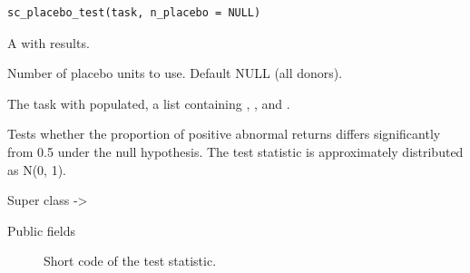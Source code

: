 \documentclass[a4paper]{book}
\begin{document}
%
\begin{Usage}
\begin{verbatim}
sc_placebo_test(task, n_placebo = NULL)
\end{verbatim}
\end{Usage}
%
\begin{Arguments}
\begin{ldescription}
\item[\code{task}] A  with results.

\item[\code{n\_placebo}] Number of placebo units to use. Default NULL (all donors).
\end{ldescription}
\end{Arguments}
%
\begin{Value}
The task with  populated, a list containing
, , and .
\end{Value}
%
\begin{Description}
Tests whether the proportion of positive abnormal returns differs
significantly from 0.5 under the null hypothesis. The test statistic
is approximately distributed as N(0, 1).
\end{Description}
%
\begin{Section}{Super class}
 -> 
\end{Section}
%
\begin{Section}{Public fields}

\begin{description}

\item[] Short code of the test statistic.

\end{description}


\end{Section}
%
\end{document}
